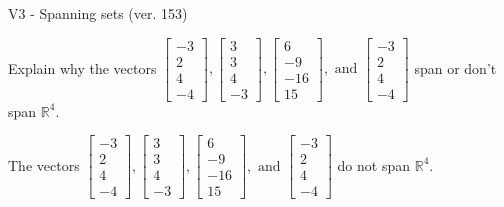 \begin{exercise}
  \begin{exerciseTitle}V3 - Spanning sets (ver. 153)\end{exerciseTitle}
  \begin{exerciseStatement}
    Explain why the vectors \(\left[\begin{array}{r}
-3 \\
2 \\
4 \\
-4
\end{array}\right] , \left[\begin{array}{r}
3 \\
3 \\
4 \\
-3
\end{array}\right] , \left[\begin{array}{r}
6 \\
-9 \\
-16 \\
15
\end{array}\right] , \text{ and } \left[\begin{array}{r}
-3 \\
2 \\
4 \\
-4
\end{array}\right]\) span or don't span \(\mathbb{R}^4\). 
	


  \end{exerciseStatement}
  \begin{exerciseAnswer}
   The vectors \(\left[\begin{array}{r}
-3 \\
2 \\
4 \\
-4
\end{array}\right] , \left[\begin{array}{r}
3 \\
3 \\
4 \\
-3
\end{array}\right] , \left[\begin{array}{r}
6 \\
-9 \\
-16 \\
15
\end{array}\right] , \text{ and } \left[\begin{array}{r}
-3 \\
2 \\
4 \\
-4
\end{array}\right]\) 
  	 do not  
	span \(\mathbb{R}^4\).
  


  \end{exerciseAnswer}
\end{exercise}